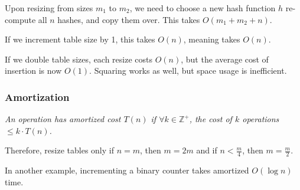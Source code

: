 Upon resizing from sizes $m_1$ to $m_2$, we need to choose a new hash function $h$ re-compute all $n$ hashes, and copy them over.
This takes $O(m_1 + m_2 + n)$.

If we increment table size by 1, this takes $O(n)$, meaning  takes $O(n)$.

If we double table sizes, each resize costs $O(n)$, but the average cost of insertion is now $O(1)$.
Squaring works as well, but space usage is inefficient.

\subsubsection{Amortization}
\emph{An operation has amortized cost $T(n)$ if $\forall k \in \mathbb{Z}^+$, the cost of $k$ operations $\leq k \cdot T(n)$.}

Therefore, resize tables only if $n = m$, then $m = 2m$ and if $n < \frac{m}{4}$, then $m = \frac{m}{2}$.

In another example, incrementing a binary counter takes amortized $O(\log n)$ time.